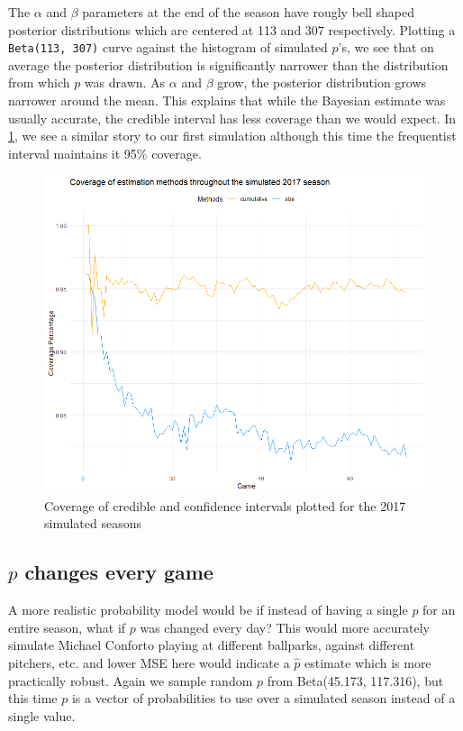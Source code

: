 \documentclass[10pt,a4paper]{article}
\begin{document}
The $\alpha$ and $\beta$ parameters at the end of the season have rougly bell shaped posterior distributions which are centered at 113 and 307 respectively.
Plotting a \texttt{Beta(113, 307)} curve against the histogram of simulated $p$'s, we see that on average the posterior distribution is significantly narrower than the distribution from which $p$ was drawn.
As $\alpha$ and $\beta$ grow, the posterior distribution grows narrower around the mean.
This explains that while the Bayesian estimate was usually accurate, the credible interval has less coverage than we would expect.
In \ref{fig:coverages_2017}, we see a similar story to our first simulation although this time the frequentist interval maintains it 95\% coverage. 

\begin{figure}[ht]
	\centering
	\includegraphics[width=.5\textwidth]{coverages_2017}
	\caption{\label{fig:coverages_2017} Coverage of credible and confidence intervals plotted for the 2017 simulated seasons} 
\end{figure}

\subsection{$p$ changes every game}
A more realistic probability model would be if instead of having a single $p$ for an entire season, what if $p$ was changed every day?
This would more accurately simulate Michael Conforto playing at different ballparks, against different pitchers, etc. and lower MSE here would indicate a $\hat{p}$ estimate which is more practically robust.
Again we sample random $p$ from Beta(45.173, 117.316), but this time $p$ is a vector of probabilities to use over a simulated season instead of a single value.
\end{document}
